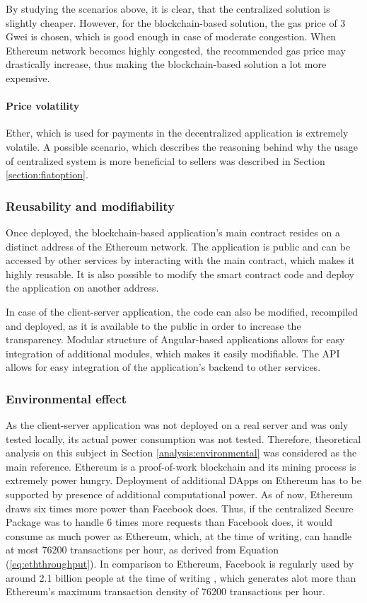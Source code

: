 By studying the scenarios above, it is clear, that the centralized solution is slightly cheaper. However, for the blockchain-based solution, the gas price of 3 Gwei is chosen, which is good enough in case of moderate congestion. When Ethereum network becomes highly congested, the recommended gas price may drastically increase, thus making the blockchain-based solution a lot more expensive.

\paragraph{Price volatility}
Ether, which is used for payments in the decentralized application is extremely volatile. A possible scenario, which describes the reasoning behind why the usage of centralized system is more beneficial to sellers was described in Section \ref{section:fiatoption}.

\subsubsection{Reusability and modifiability}
Once deployed, the blockchain-based application's main contract resides on a distinct address of the Ethereum network. The application is public and can be accessed by other services by interacting with the main contract, which makes it highly reusable. It is also possible to modify the smart contract code and deploy the application on another address.

In case of the client-server application, the code can also be modified, recompiled and deployed, as it is available to the public in order to increase the transparency. Modular structure of Angular-based applications allows for easy integration of additional modules, which makes it easily modifiable. The API allows for easy integration of the application's backend to other services.

\subsubsection{Environmental effect}
As the client-server application was not deployed on a real server and was only tested locally, its actual power consumption was not tested. Therefore, theoretical analysis on this subject in Section \ref{analysis:environmental} was considered as the main reference. Ethereum is a proof-of-work blockchain and its mining process is extremely power hungry. Deployment of additional DApps on Ethereum has to be supported by presence of additional computational power. As of now, Ethereum draws six times more power than Facebook does. Thus, if the centralized Secure Package was to handle 6 times more requests than Facebook does, it would consume as much power as Ethereum, which, at the time of writing, can handle at most 76200 transactions per hour, as derived from Equation (\ref{eq:eththroughput}). In comparison to Ethereum, Facebook is regularly used by around 2.1 billion people at the time of writing \citep{faceusers}, which generates alot more than Ethereum's maximum transaction density of 76200 transactions per hour.

